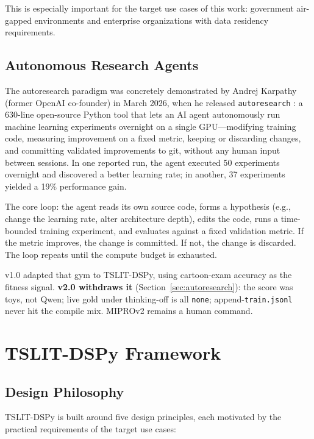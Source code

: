\documentclass[11pt]{article}
\begin{document}
This is especially important for the target use cases of this work:
government air-gapped environments and enterprise organizations with
data residency requirements.

\subsection{Autonomous Research Agents}

The autoresearch paradigm was concretely demonstrated by Andrej Karpathy
(former OpenAI co-founder) in March 2026, when he released
\texttt{autoresearch} \cite{karpathy_autoresearch}: a 630-line open-source
Python tool that lets an AI agent autonomously run machine learning
experiments overnight on a single GPU---modifying training code, measuring
improvement on a fixed metric, keeping or discarding changes, and
committing validated improvements to git, without any human input between
sessions. In one reported run, the agent executed 50 experiments overnight
and discovered a better learning rate; in another, 37 experiments yielded a
19\% performance gain.

The core loop: the agent reads its own source code, forms a hypothesis
(e.g., change the learning rate, alter architecture depth), edits the code,
runs a time-bounded training experiment, and evaluates against a fixed
validation metric. If the metric improves, the change is committed. If not,
the change is discarded. The loop repeats until the compute budget is
exhausted.

v1.0 adapted that gym to TSLIT-DSPy, using cartoon-exam accuracy as
the fitness signal. \textbf{v2.0 withdraws it} (Section~\ref{sec:autoresearch}):
the score was toys, not Qwen; live gold under thinking-off is all
\texttt{none}; append-\texttt{train.jsonl} never hit the compile mix.
MIPROv2 remains a human command.

\section{TSLIT-DSPy Framework}

\subsection{Design Philosophy}

TSLIT-DSPy is built around five design principles, each motivated by the
practical requirements of the target use cases:
\end{document}
